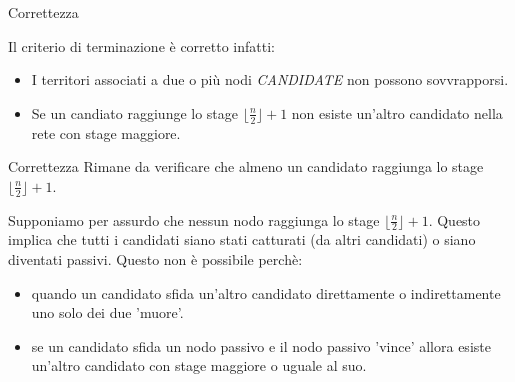 \begin{frame}{Correttezza}

Il criterio di terminazione è corretto infatti:

\begin{itemize}
\setlength\itemsep{2em}
 \item I territori associati a due o più nodi \textit{CANDIDATE} non possono sovvrapporsi.
 \item Se un candiato raggiunge lo stage $\lfloor\frac{n}{2}\rfloor+1$ non esiste un'altro candidato nella rete con stage maggiore.
\end{itemize}

\end{frame}

\begin{frame}{Correttezza}
 Rimane da verificare che almeno un candidato raggiunga lo stage $\lfloor\frac{n}{2}\rfloor+1$. 

 Supponiamo per assurdo che nessun nodo raggiunga lo stage $\lfloor\frac{n}{2}\rfloor+1$.  Questo implica che tutti i candidati siano stati catturati (da altri candidati) o siano diventati passivi.
 Questo non è possibile perchè:
 \begin{itemize}
  \item quando un candidato sfida un'altro candidato direttamente o indirettamente uno solo dei due 'muore'.
  \item se un candidato sfida un nodo passivo e il nodo passivo 'vince' allora esiste un'altro candidato con stage maggiore o uguale al suo. 
 \end{itemize}

 
 
  
\end{frame}

